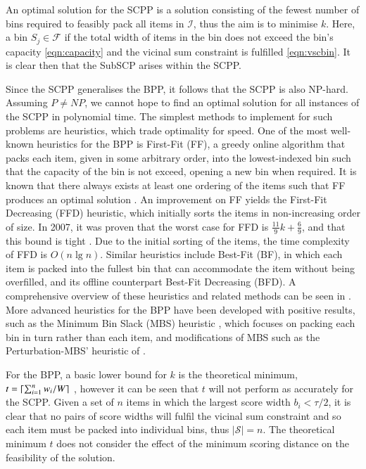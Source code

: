 \documentclass[authoryear]{elsarticle}
\begin{document}
\noindent An optimal solution for the SCPP is a solution consisting of the fewest number of bins required to feasibly pack all items in $\mathcal{I}$, thus the aim is to minimise $k$. Here, a bin $S_j \in \mathcal{F}$ if the total width of items in the bin does not exceed the bin's capacity \eqref{eqn:capacity} and the vicinal sum constraint is fulfilled \eqref{eqn:vscbin}. It is clear then that the SubSCP arises within the SCPP.

Since the SCPP generalises the BPP, it follows that the SCPP is also NP-hard. Assuming $P \neq NP$, we cannot hope to find an optimal solution for all instances of the SCPP in polynomial time. The simplest methods to implement for such problems are heuristics, which trade optimality for speed. One of the most well-known heuristics for the BPP is First-Fit (FF), a greedy online algorithm that packs each item, given in some arbitrary order, into the lowest-indexed bin such that the capacity of the bin is not exceed, opening a new bin when required. It is known that there always exists at least one ordering of the items such that FF produces an optimal solution \citep{lewis2009}. An improvement on FF yields the First-Fit Decreasing (FFD) heuristic, which initially sorts the items in non-increasing order of size. In 2007, it was proven that the worst case for FFD is $\frac{11}{9}k + \frac{6}{9}$, and that this bound is tight \citep{dosa2007}. Due to the initial sorting of the items, the time complexity of FFD is $O(n \lg n)$. Similar heuristics include Best-Fit (BF), in which each item is packed into the fullest bin that can accommodate the item without being overfilled, and its offline counterpart Best-Fit Decreasing (BFD). A comprehensive overview of these heuristics and related methods can be seen in \citet{coffman1984}. More advanced heuristics for the BPP have been developed with positive results, such as the Minimum Bin Slack (MBS) heuristic \citep{gupta1999}, which focuses on packing each bin in turn rather than each item, and modifications of MBS such as the Perturbation-MBS' heuristic of \citet{fleszar2002}. 

For the BPP, a basic lower bound for $k$ is the theoretical minimum, $t = \lceil\sum_{i=1}^{n} w_i / W\rceil$ \citep{martello1990l}, however it can be seen that $t$ will not perform as accurately for the SCPP. Given a set of $n$ items in which the largest score width $b_i < \tau / 2$, it is clear that no pairs of score widths will fulfil the vicinal sum constraint and so each item must be packed into individual bins, thus $|\mathcal{S}| = n$. The theoretical minimum $t$ does not consider the effect of the minimum scoring distance on the feasibility of the solution.
\end{document}
